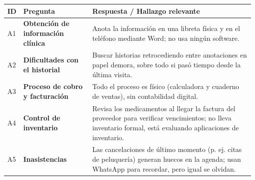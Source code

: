 \documentclass[
]{article}
\newcounter{none} %
\begin{document}
{\def\LTcaptype{none} %
\begin{longtable}[]{|
  >{\centering\arraybackslash}p{}|
  >{\raggedright\arraybackslash}p{}|
  >{\raggedright\arraybackslash}p{}|}
\hline
\begin{minipage}[b]{\linewidth}\centering
\textbf{ID}
\end{minipage} & \begin{minipage}[b]{\linewidth}\centering
\textbf{Pregunta}
\end{minipage} & \begin{minipage}[b]{\linewidth}\raggedright
\textbf{Respuesta / Hallazgo relevante}
\end{minipage} \\
\hline
\endhead
\hline
\endlastfoot
A1 & \textbf{Obtención de información clínica} &
\begin{minipage}[t]{\linewidth}\raggedright
Anota la información en una libreta física y en el teléfono mediante Word; no usa ningún software.
\end{minipage} \\
\hline
A2 & \textbf{Dificultades con el historial} &
\begin{minipage}[t]{\linewidth}\raggedright
Buscar historias retrocediendo entre anotaciones en papel demora, sobre todo si pasó tiempo desde la última visita.
\end{minipage} \\
\hline
A3 & \textbf{Proceso de cobro y facturación} &
\begin{minipage}[t]{\linewidth}\raggedright
Todo el proceso es físico (calculadora y cuaderno de ventas), sin contabilidad digital.
\end{minipage} \\
\hline
A4 & \textbf{Control de inventario} &
\begin{minipage}[t]{\linewidth}\raggedright
Revisa los medicamentos al llegar la factura del proveedor para verificar vencimientos; no lleva inventario formal, está evaluando aplicaciones de inventario.
\end{minipage} \\
\hline
A5 & \textbf{Inasistencias} &
\begin{minipage}[t]{\linewidth}\raggedright
Las cancelaciones de último momento (p. ej. citas de peluquería) generan huecos en la agenda; usan WhatsApp para recordar, pero igual se olvidan.
\end{minipage} \\

\end{longtable}}
\end{document}
